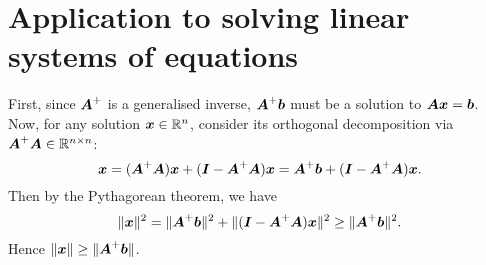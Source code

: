 \documentclass{report}
\begin{document}
	\section{Application to solving linear systems of equations}
	\begin{myproof}
		First, since $\bmA^+$ is a generalised inverse, $\bmA^+\bmb$ must be a solution to $\bmA\bmx=\bmb$. Now, for any solution $\bmx\in\Rn$, consider its orthogonal decomposition via $\bmA^+\bmA\in\RR^{n\times n}$:
		$$\bmx=(\bmA^+\bmA)\bmx+(\bmI-\bmA^+\bmA)\bmx=\bmA^+\bmb+(\bmI-\bmA^+\bmA)\bmx.$$
		Then by the Pythagorean theorem, we have
		$$\|\bmx\|^2=\|\bmA^+\bmb\|^2+\|(\bmI-\bmA^+\bmA)\bmx\|^2\geq \|\bmA^+\bmb\|^2.$$
		Hence $\|\bmx\|\geq\|\bmA^+\bmb\|$.
	\end{myproof}
\end{document}
